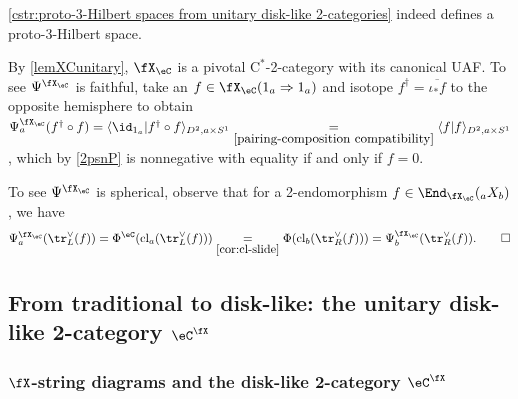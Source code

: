 \documentclass[12pt,reqno]{amsart}
\newcommand{\cl}{\mathrm{cl}}
\newcommand{\psn}{\Phi}
\newcommand{\C}{\eC}
\newcommand{\fcj}[1]{\overline{#1}}
\newcommand{\bkt}[2]{\langle #1|#2 \rangle}
\newcommand{\Cstar}{\ensuremath{\mathrm{C}^{*}}}
\begin{document}
\begin{lemma}
\cref{cstr:proto-3-Hilbert spaces from unitary disk-like 2-categories} indeed defines a proto-3-Hilbert space.
\end{lemma}

\begin{pf}
By \cref{lemXCunitary}, $\fX_\C$ is a pivotal $\Cstar$-2-category with its canonical UAF. To see $\Psi^{\fX_\C}$ is faithful, take an $f\in\fX_\C(1_a\Rightarrow 1_a)$ and isotope $f^\dag=\fcj{\iota_*f}$ to the opposite hemisphere to obtain $\Psi_a^{\fX_\C}(f^\dag\circ f)=\bkt{\id_{1_a}}{f^\dag\circ f}_{D^2,a\times S^1}\underset{\eqref{pairing-composition compatibility}}{=}\bkt{f}{f}_{D^2,a\times S^1}$, which by \ref{2psnP} is nonnegative with equality if and only if $f=0$.

To see $\Psi^{\fX_\C}$ is spherical, observe that for a 2-endomorphism $f\in\End_{\fX_\C}({}_aX_b)$, we have
\[
\Psi_a^{\fX_\C}(\tr_L^\vee(f))=\psn^\C(\cl_a(\tr_L^\vee(f)))\underset{\eqref{cor:cl-slide}}{=}\psn(\cl_b(\tr_R^\vee(f)))=\Psi_b^{\fX_\C}(\tr_R^\vee(f)).\qedhere
\]
\end{pf}

\subsection{From traditional to disk-like: the unitary disk-like 2-category \texorpdfstring{$\C^\fX$}{C(X)}}

\subsubsection{\texorpdfstring{$\fX$}{X}-string diagrams and the disk-like 2-category \texorpdfstring{$\C^\fX$}{C(X)}}
\end{document}

